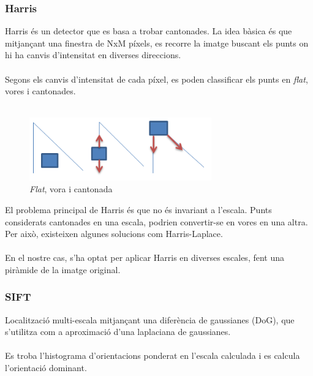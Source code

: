 	\subsubsection{Harris}
	Harris és un detector que es basa a trobar cantonades. La idea bàsica és que mitjançant una finestra de NxM píxels, es recorre la imatge buscant els punts on hi ha canvis d'intensitat
	en diverses direccions.\\\\
	Segons els canvis d'intensitat de cada píxel, es poden classificar els punts en \textit{flat}, vores i cantonades.\\\\
	\begin{figure}[H]
		\centering
		\includegraphics[width=0.7\textwidth]{images/harris}
		\caption{\textit{Flat}, vora i cantonada}
	\end{figure}
	\noindent
	El problema principal de Harris és que no és invariant a l'escala. Punts considerats cantonades en una escala, podrien convertir-se en vores en una altra.
	Per això, existeixen algunes solucions com Harris-Laplace.\\\\
	En el nostre cas, s'ha optat per aplicar Harris en diverses escales, fent una piràmide de la imatge original.

	\subsubsection{SIFT}
	Localització multi-escala mitjançant una diferència de gaussianes (DoG), que s'utilitza com a aproximació d'una laplaciana de gaussianes.\\\\
	Es troba l'histograma d'orientacions ponderat en l'escala calculada i es calcula l'orientació dominant.

